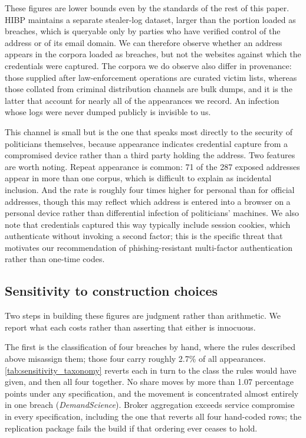 \documentclass[12pt, letterpaper]{article}
\begin{document}
These figures are lower bounds even by the standards of the rest of this paper. HIBP maintains a separate stealer-log dataset, larger than the portion loaded as breaches, which is queryable only by parties who have verified control of the address or of its email domain. We can therefore observe whether an address appears in the corpora loaded as breaches, but not the websites against which the credentials were captured. The corpora we do observe also differ in provenance: those supplied after law-enforcement operations are curated victim lists, whereas those collated from criminal distribution channels are bulk dumps, and it is the latter that account for nearly all of the appearances we record. An infection whose logs were never dumped publicly is invisible to us.

This channel is small but is the one that speaks most directly to the security of politicians themselves, because appearance indicates credential capture from a compromised device rather than a third party holding the address. Two features are worth noting. Repeat appearance is common: 71 of the 287 exposed addresses appear in more than one corpus, which is difficult to explain as incidental inclusion. And the rate is roughly four times higher for personal than for official addresses, though this may reflect which address is entered into a browser on a personal device rather than differential infection of politicians' machines. We also note that credentials captured this way typically include session cookies, which authenticate without invoking a second factor; this is the specific threat that motivates our recommendation of phishing-resistant multi-factor authentication rather than one-time codes.



\subsection*{Sensitivity to construction choices}\label{sec:sensitivity}

Two steps in building these figures are judgment rather than arithmetic. We report what each costs rather than asserting that either is innocuous.

The first is the classification of four breaches by hand, where the rules described above misassign them; those four carry roughly 2.7\% of all appearances. \cref{tab:sensitivity_taxonomy} reverts each in turn to the class the rules would have given, and then all four together. No share moves by more than 1.07 percentage points under any specification, and the movement is concentrated almost entirely in one breach (\textit{DemandScience}). Broker aggregation exceeds service compromise in every specification, including the one that reverts all four hand-coded rows; the replication package fails the build if that ordering ever ceases to hold.
\end{document}
